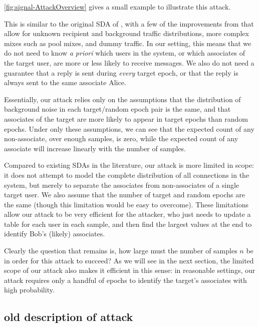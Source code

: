 \AttackOverview

\cref{fig:signal-AttackOverview}
gives a small example to illustrate this attack.

This is similar to the original SDA of \cite{SDA}, with a few of the
improvements from \cite{SDA-MD05} that allow for unknown recipient and
background traffic distributions, more complex mixes such as pool mixes,
and dummy traffic. In our setting, this means that we do not need to
know \emph{a priori} which users in the system, or which associates of
the target user, are more or less likely to receive messages. We also do
not need a guarantee that a reply is sent during \emph{every} target
epoch, or that the reply is always sent to the same associate Alice.

Essentially, our attack relies only on the assumptions that the
distribution of background noise in each target/random epoch pair is the
same, and that associates of the target are more likely to appear in
target epochs than random epochs. Under only these assumptions, we can
see that the expected count of any non-associate, over enough samples,
is zero, while the expected count of any associate will increase
linearly with the number of samples.

Compared to existing SDAs in the literature, our attack is more limited
in scope:
it does not attempt to model the complete distribution of all
connections in the system, but merely to separate the associates from
non-associates of a single target user. We also assume that the number
of target and random epochs are the same (though this limitation would
be easy to overcome). These limitations allow our attack to be
very efficient for the attacker, who just needs to update a table for
each user in each sample, and then find the largest values at the end to
identify Bob's (likely) associates.

Clearly the question that remains is, how large must the number of
samples $n$ be in order for this attack to succeed? As we will see in the next section,
the limited scope of our attack also makes it efficient in this sense:
in reasonable settings, our attack requires only a handful of epochs to identify
the target's associates with high probability.

\ifdefined\oldattacktext

\subsection{old description of attack}

